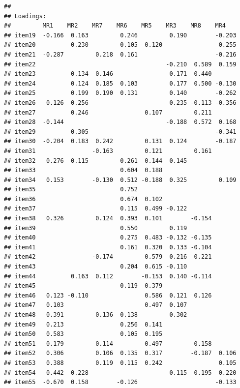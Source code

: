\documentclass[
  english,
  man]{apa6}
\begin{document}
\begin{verbatim}
## 
## Loadings:
##         MR1    MR2    MR7    MR6    MR5    MR3    MR8    MR4   
## item19  -0.166  0.163         0.246         0.190        -0.203
## item20          0.230        -0.105  0.120               -0.255
## item21  -0.287         0.218  0.161                      -0.216
## item22                                     -0.210  0.589  0.159
## item23          0.134  0.146                0.171  0.440       
## item24          0.124  0.185  0.103         0.177  0.500 -0.130
## item25          0.199  0.190  0.131         0.140        -0.262
## item26   0.126  0.256                       0.235 -0.113 -0.356
## item27          0.246                0.107         0.211       
## item28  -0.144                             -0.188  0.572  0.168
## item29          0.305                                    -0.341
## item30  -0.204  0.183  0.242         0.131  0.124        -0.187
## item31                -0.163         0.121         0.161       
## item32   0.276  0.115         0.261  0.144  0.145              
## item33                        0.604  0.188                     
## item34   0.153        -0.130  0.512 -0.188  0.325         0.109
## item35                        0.752                            
## item36                        0.674  0.102                     
## item37                        0.115  0.499 -0.122              
## item38   0.326         0.124  0.393  0.101        -0.154       
## item39                        0.550         0.119              
## item40                        0.275  0.483 -0.132 -0.135       
## item41                        0.161  0.320  0.133 -0.104       
## item42                -0.174         0.579  0.216  0.221       
## item43                        0.204  0.615 -0.110              
## item44          0.163  0.112        -0.153  0.140 -0.114       
## item45                        0.119  0.379                     
## item46   0.123 -0.110                0.586  0.121  0.126       
## item47   0.103                       0.497  0.107              
## item48   0.391         0.136  0.138         0.302              
## item49   0.213                0.256  0.141                     
## item50   0.583                0.105  0.195                     
## item51   0.179         0.114         0.497        -0.158       
## item52   0.306         0.106  0.135  0.317        -0.187  0.106
## item53   0.388         0.119  0.115  0.242                0.105
## item54   0.442  0.228                       0.115 -0.195 -0.220
## item55  -0.670  0.158        -0.126                      -0.133

\end{verbatim}
\end{document}

